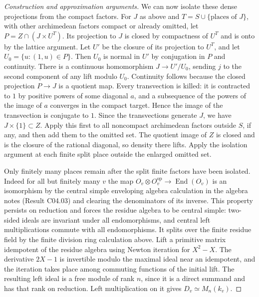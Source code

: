\documentclass[11pt,a4paper,openany,oneside]{book}
\theoremstyle{resultstyle}
\theoremstyle{definition}
\numberwithin{equation}{chapter}
\begin{document}
\begin{proof}[Construction and approximation arguments]
We can now isolate these dense projections from the compact
factors. For \(J\) as above and \(T=S\cup\{\text{places of }J\}\),
with other archimedean factors compact or already omitted, let
\(P=Z\cap(J\times U^T)\). Its projection to \(J\) is closed by
compactness of \(U^T\) and is onto by the lattice argument.
Let \(U'\) be the closure of its projection to \(U^T\), and
let \(U_0=\{u:(1,u)\in P\}\). Then \(U_0\) is normal in \(U'\)
by conjugation in \(P\) and continuity. There is a continuous
homomorphism \(J\to U'/U_0\), sending \(j\) to the second
component of any lift modulo \(U_0\). Continuity follows
because the closed projection \(P\to J\) is a quotient map.
Every transvection is killed: it is contracted to \(1\) by
positive powers of some diagonal \(a\), and a subsequence of
the powers of the image of \(a\) converges in the compact
target. Hence the image of the transvection is conjugate to
\(1\). Since the transvections generate \(J\), we have
\(J\times\{1\}\subset Z\). Apply this first to all noncompact
archimedean factors outside \(S\), if any, and then add them to
the omitted set. The quotient image of \(Z\) is closed and is
the closure of the rational diagonal, so density there lifts.
Apply the isolation argument at each finite split place
outside the enlarged omitted set.

Only finitely many places remain after the split finite factors
have been isolated. Indeed for all but finitely many \(v\) the
map \(O_v\otimes O_v^{\mathrm{op}}\to\operatorname{End}(O_v)\)
is an isomorphism by the central simple enveloping algebra
calculation in the algebra notes (Result C04.03) and clearing
the denominators of its inverse. This property persists on
reduction and forces the residue algebra to be central simple:
two-sided ideals are invariant under all endomorphisms, and
central left multiplications commute with all endomorphisms.
It splits over the finite residue field by the finite division
ring calculation above. Lift a primitive matrix idempotent of
the residue algebra using Newton iteration for \(X^2-X\).
The derivative \(2X-1\) is invertible modulo the maximal ideal
near an idempotent, and the iteration takes place among
commuting functions of the initial lift. The resulting left
ideal is a free module of rank \(n\), since it is a direct
summand and has that rank on reduction. Left multiplication on
it gives \(D_v\simeq M_n(k_v)\).


\end{proof}
\end{document}
